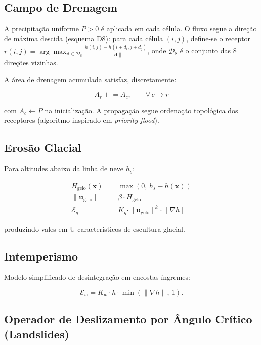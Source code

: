 \documentclass[11pt,a4paper]{article}
\begin{document}
\subsection{Campo de Drenagem}

A precipitação uniforme $P > 0$ é aplicada em cada célula. O fluxo segue a direção de
máxima descida (esquema D8): para cada célula $(i,j)$, define-se o receptor
$r(i,j) = \arg\max_{\mathbf{d} \in \mathcal{D}_8} \frac{h(i,j) - h(i+d_i, j+d_j)}{\|\mathbf{d}\|}$,
onde $\mathcal{D}_8$ é o conjunto das 8 direções vizinhas.

A área de drenagem acumulada satisfaz, discretamente:

\begin{equation}
  A_r \mathrel{+}= A_c, \qquad \forall\, c \to r
  \label{eq:accumulation}
\end{equation}

com $A_c \leftarrow P$ na inicialização. A propagação segue ordenação topológica dos
receptores (algoritmo inspirado em \emph{priority-flood}).

\subsection{Erosão Glacial}

Para altitudes abaixo da linha de neve $h_s$:

\begin{align}
  H_{\text{gelo}}(\mathbf{x}) &= \max(0,\, h_s - h(\mathbf{x})) \\
  \|\mathbf{u}_{\text{gelo}}\| &= \beta \cdot H_{\text{gelo}} \\
  \mathcal{E}_g &= K_g \cdot \|\mathbf{u}_{\text{gelo}}\|^k \cdot \|\nabla h\|
  \label{eq:glacial-detail}
\end{align}

produzindo vales em U característicos de escultura glacial.

\subsection{Intemperismo}

Modelo simplificado de desintegração em encostas íngremes:

\begin{equation}
  \mathcal{E}_w = K_w \cdot h \cdot \min(\|\nabla h\|,\, 1).
\end{equation}

\subsection{Operador de Deslizamento por Ângulo Crítico (Landslides)}
\end{document}
